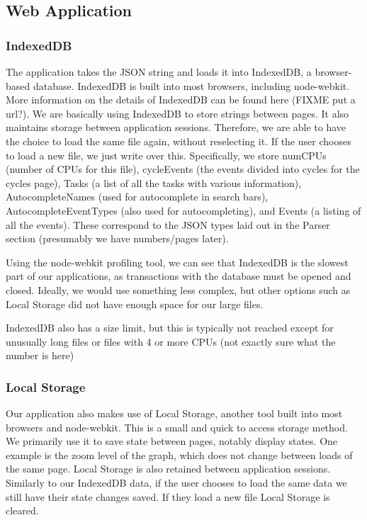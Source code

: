 \documentclass{hmcclinic}
\begin{document}
  \subsection{Web Application}

  \subsubsection{IndexedDB}

  The application takes the JSON string and loads it into IndexedDB, a
  browser-based database. IndexedDB is built into most browsers, including
  node-webkit. More information on the details of IndexedDB can be found here
  (FIXME put a url?). We are basically using IndexedDB to store strings between
  pages. It also maintains storage between application sessions. Therefore, we
  are able to have the choice to load the same file again, without reselecting
  it. If the user chooses to load a new file, we just write over this.
  Specifically, we store numCPUs (number of CPUs for this file), cycleEvents
  (the events divided into cycles for the cycles page), Tasks (a list of all the
  tasks with various information), AutocompleteNames (used for autocomplete in
  search bars), AutocompleteEventTypes (also used for autocompleting), and
  Events (a listing of all the events). These correspond to the JSON types laid
  out in the Parser section (presumably we have numbers/pages later).

  Using the node-webkit profiling tool, we can see that IndexedDB is the slowest
  part of our applications, as transactions with the database must be opened and
  closed. Ideally, we would use something less complex, but other options such
  as Local Storage did not have enough space for our large files.

  IndexedDB also has  a size limit, but this is typically not reached except for
  unusually long files or files with 4 or more CPUs (not exactly sure what the
  number is here)

  \subsubsection{Local Storage}

  Our application also makes use of Local Storage, another tool
  built into most browsers and node-webkit. This is a small and quick to access
  storage method. We primarily use it to save state between pages, notably
  display states. One example is the zoom level of the graph, which does not
  change between loads of the same page. Local Storage is also retained between
  application sessions. Similarly to our IndexedDB data, if the user chooses to
  load the same data we still have their state changes saved. If they load a new
  file Local Storage is cleared.
\end{document}
